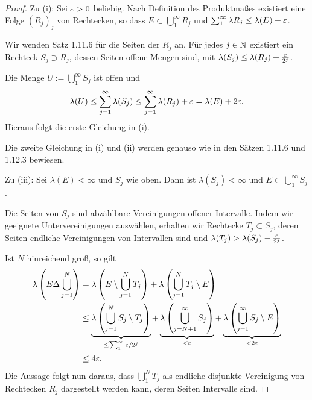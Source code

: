 \begin{proof}
  Zu (i): Sei $\varepsilon > 0$ beliebig. Nach Definition des Produktmaßes existiert
  eine Folge $(R_j)_j$ von Rechtecken, so dass $E \subset \bigcup_1^\infty
  R_j$ und $\sum_1^\infty \lambda R_j \le \lambda(E) + \varepsilon$.

  Wir wenden Satz 1.11.6 für die Seiten der $R_j$ an. Für jedes $j \in \mathbb{N}$
  existiert ein Rechteck $S_j \supset R_j$, dessen Seiten offene Mengen
  sind, mit $\lambda(S_j) \le \lambda(R_j) + \frac{\varepsilon}{2^j}$.

  Die Menge $U := \bigcup_1^\infty S_j$ ist offen und
  \[ \lambda(U) \le  \sum_{j=1}^\infty \lambda (S_j) \le \sum_{j=1}^\infty
    \lambda (R_j) + \varepsilon = \lambda(E) + 2 \varepsilon. \]
  Hieraus folgt die erste Gleichung in (i).

  Die zweite Gleichung in (i) und (ii) werden genauso wie in den Sätzen
  1.11.6 und 1.12.3 bewiesen.

  Zu (iii): Sei $\lambda(E) < \infty$ und $S_j$ wie oben. Dann ist $\lambda(S_j)
  < \infty$ und $E \subset \bigcup_1^\infty S_j$.

  Die Seiten von $S_j$ sind abzählbare Vereinigungen offener Intervalle. Indem
  wir geeignete Untervereinigungen auswählen, erhalten wir Rechtecke $T_j
  \subset S_j$, deren Seiten endliche Vereinigungen von Intervallen sind und
  $\lambda(T_j) > \lambda(S_j) - \frac{\varepsilon}{2^j}$.

  Ist $N$ hinreichend groß, so gilt
  \[ \begin{aligned}
      \lambda \left( E \Delta \bigcup_{j=1}^N \right)
      &= \lambda \left( E \setminus \bigcup_{j=1}^N T_j \right)
      + \lambda \left( \bigcup_{j=1}^N T_j \setminus E \right) \\
      &\le \underbrace{\lambda \left( \bigcup_{j=1}^N S_j \setminus T_j
        \right)}_{\le \sum_1^\infty e/2^j}
      + \underbrace{\lambda \left( \bigcup_{j=N+1}^\infty S_j \right)}_{< \varepsilon}
      + \underbrace{\lambda \left( \bigcup_{j=1}^\infty S_j \setminus E \right)}_{< 2
        \varepsilon} \\
      &\le 4 \varepsilon.
    \end{aligned} \]
  Die Aussage folgt nun daraus, dass $\bigcup_1^N T_j$ als endliche disjunkte
  Vereinigung von Rechtecken $R_j$ dargestellt werden kann, deren Seiten
  Intervalle sind.
\end{proof}

